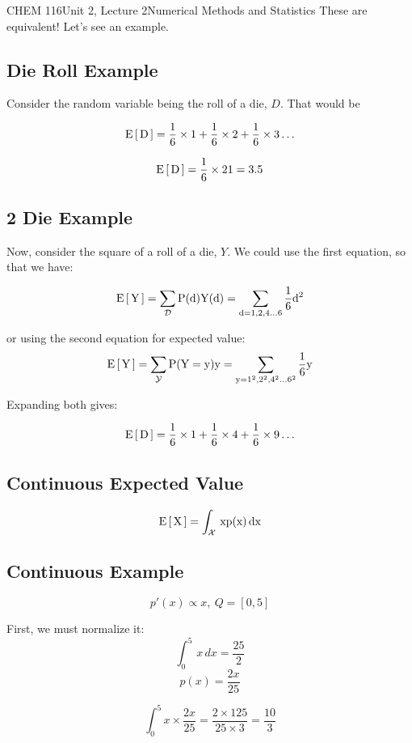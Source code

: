 \documentclass{article}
\begin{document}
\begin{tdoc}{CHEM 116}{Unit 2, Lecture 2}{Numerical Methods and Statistics}
These are equivalent! Let's see an example.

\subsection{Die Roll Example}

Consider the random variable being the roll of a die, $D$. That would be 

\[
\rm{E}\left[\,D\,\right] = \frac{1}{6}\times{}1 + \frac{1}{6}\times{}2 + \frac{1}{6}\times{}3 \ldots
\]

\[
\rm{E}\left[\,D\,\right] = \frac{1}{6}\times 21 = 3.5
\]


\subsection{2 Die Example}
Now, consider the square of a roll of a die, $Y$. We could use the first
equation, so that we have:

\[
\rm{E}\left[\,Y\,\right] = \sum_\mathcal{D} P(d)Y(d) =  \sum_{d=1,2,4...6} \frac{1}{6}d^2
\]

or using the second equation for expected value:
\[
\rm{E}\left[\,Y\,\right] = \sum_\mathcal{Y} P(Y=y)y =  \sum_{y=1^2,2^2,4^2...6^2} \frac{1}{6}y
\]

Expanding both gives:

\[
\rm{E}\left[\,D\,\right] = \frac{1}{6}\times{}1 + \frac{1}{6}\times{}4 + \frac{1}{6}\times{}9 \ldots
\]

\subsection{Continuous Expected Value}

\begin{equation}
\rm{E}\left[\,X\,\right] = \int_\mathcal{X}\,xp(x)\,dx
\end{equation}


\subsection{Continuous Example}
\[
p'(x) \propto x,\:  Q = [0,5]
\]

First, we must normalize it:
\[
\int_0^5 \,x\,dx = \frac{25}{2}
\]
\[
p(x) = \frac{2x}{25}
\]

\[
\int_0^5 x\times\frac{2x}{25} = \frac{2\times 125}{25\times 3} = \frac{10}{3}
\]

\end{tdoc}
\end{document}
